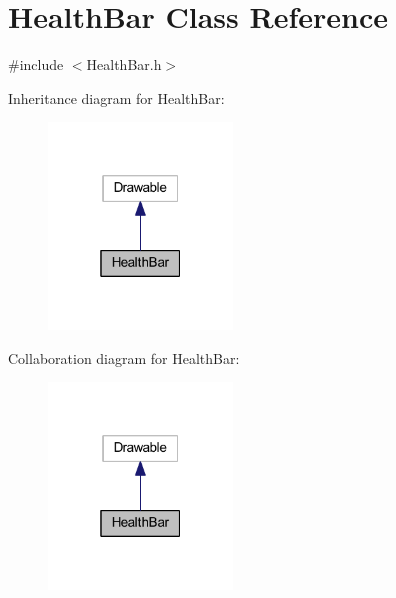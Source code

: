 \hypertarget{class_health_bar}{}\section{Health\+Bar Class Reference}
\label{class_health_bar}


{\ttfamily \#include $<$Health\+Bar.\+h$>$}



Inheritance diagram for Health\+Bar\+:\nopagebreak
\begin{figure}[H]
\begin{center}
\leavevmode
\includegraphics[width=139pt]{class_health_bar__inherit__graph}
\end{center}
\end{figure}


Collaboration diagram for Health\+Bar\+:\nopagebreak
\begin{figure}[H]
\begin{center}
\leavevmode
\includegraphics[width=139pt]{class_health_bar__coll__graph}
\end{center}
\end{figure}
